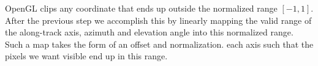 % 

OpenGL clips any coordinate that ends up outside the normalized range $[-1,1]$. After the previous step we accomplish this by linearly mapping the valid range of the along-track axis, azimuth and elevation angle into this normalized range. Such a map takes the form of an offset and normalization. each axis such that the pixels we want visible end up in this range.



